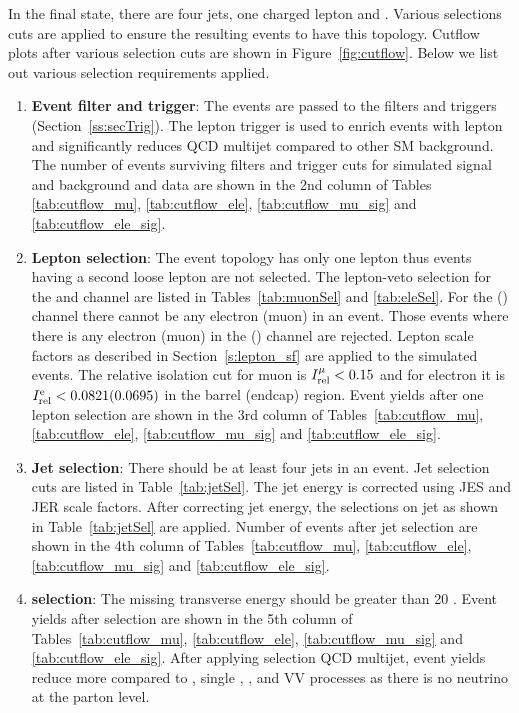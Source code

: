 
In the final state, there are four jets, one charged lepton and \MET.
Various selections cuts are applied to ensure the resulting events to have 
this topology. Cutflow plots after various selection cuts are shown in 
Figure~\ref{fig:cutflow}. Below we list out various selection requirements applied.
\begin{enumerate}[leftmargin=*]
\item{\bf{Event filter and trigger}}:
    The events are passed to the filters and triggers (Section~\ref{ss:secTrig}). 
    The lepton trigger is used to enrich events with lepton and significantly reduces QCD multijet 
    compared to other SM background. The number of events surviving filters and trigger cuts for 
    simulated signal and background and data are shown in the 2nd column of Tables
\ref{tab:cutflow_mu}, \ref{tab:cutflow_ele}, \ref{tab:cutflow_mu_sig} and \ref{tab:cutflow_ele_sig}. 
\item {\bf{Lepton selection}}:
The event topology has only one lepton thus events having a second loose lepton are not selected. 
The lepton-veto selection for the \mujets and \ejets channel are listed in Tables~\ref{tab:muonSel}
and \ref{tab:eleSel}.
For the \mujets (\ejets) channel there cannot be any electron (muon) in an event.
Those events where there is any electron (muon) in the \mujets (\ejets) channel are rejected.
Lepton scale factors as described in Section~\ref{s:lepton_sf} are applied to the simulated events.
The relative isolation cut for muon is $I_{\rm {rel}}^{\mu} < 0.15$ and for electron it is 
$I_{\rm {rel}}^{\rm{e}} < 0.0821 (0.0695)$ in the barrel (endcap) region.
Event yields after one lepton selection are shown in the 3rd column of Tables~\ref{tab:cutflow_mu},
\ref{tab:cutflow_ele}, \ref{tab:cutflow_mu_sig} and \ref{tab:cutflow_ele_sig}.

\item {\bf{Jet selection}}:
There should be at least four jets in an event.
Jet selection cuts are listed in Table~\ref{tab:jetSel}.
The jet energy is corrected using JES and JER scale factors.
After correcting jet energy, the selections on jet as shown in Table~\ref{tab:jetSel} are applied.
Number of events after jet selection are shown in the 4th column of Tables~\ref{tab:cutflow_mu},
\ref{tab:cutflow_ele}, \ref{tab:cutflow_mu_sig} and \ref{tab:cutflow_ele_sig}.

\item {\bf{\MET selection}}:
The missing transverse energy should be greater than 20 \GeV. Event yields after \MET selection are 
shown in the 5th column of Tables~\ref{tab:cutflow_mu}, \ref{tab:cutflow_ele}, \ref{tab:cutflow_mu_sig}
and \ref{tab:cutflow_ele_sig}. After applying \MET selection QCD multijet, \dyjets event yields reduce 
more compared to \ttjets, single \PQt, \wjets, and VV processes as there is no neutrino at the parton level.


\end{enumerate}

